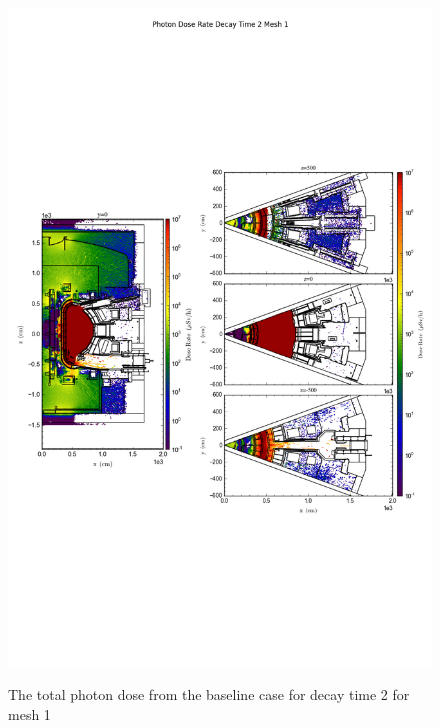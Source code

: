 \begin{figure}[ht!]
\centering
\includegraphics[trim={0cm 9cm 0cm 10cm},clip,scale=0.75]{../plots/final_model/Photon_Dose_Rate_Decay_Time_2_Mesh_1.png}
\label{fig:photons_dc2_no4bc_m1_flux}
\caption{The total photon dose from the baseline case for decay time 2 for mesh 1}
\end{figure}
